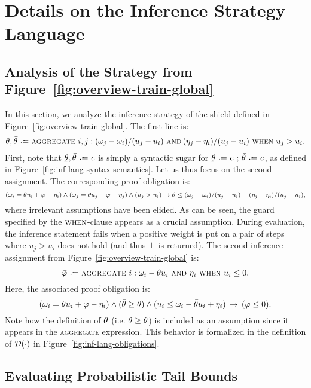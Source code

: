 \documentclass[acmsmall,screen,nonacm]{acmart}
\begin{document}
\section{Details on the Inference Strategy Language}\label{ap:inf-details}

\subsection{Analysis of the Strategy from Figure~\ref{fig:overview-train-global}}\label{ap:train-global-inf-strategy}
In this section, we analyze the inference strategy of the shield defined in Figure~\ref{fig:overview-train-global}. The first line is:
\[ \TrainThetaSlopeMin, \TrainThetaSlopeMax \slassign \slaggregate i, j: (\omega_j - \omega_i)/(u_j - u_i) \sland (\eta_j - \eta_i)/(u_j - u_i) \slwhen u_j > u_i. \]
First, note that $\TrainThetaSlopeMin, \TrainThetaSlopeMax \slassign e$ is simply a syntactic sugar for $\TrainThetaSlopeMin \slassign e \seq \TrainThetaSlopeMax \slassign e$, as defined in Figure~\ref{fig:inf-lang-syntax-semantics}. Let us thus focus on the second assignment. The corresponding proof obligation is:
\[ (\omega_i = \theta u_i + \varphi - \eta_i) \land (\omega_j = \theta u_j + \varphi - \eta_j) \land (u_j > u_i) \rightarrow \theta \le (\omega_j - \omega_i)/(u_j - u_i) + (\eta_j - \eta_i)/(u_j - u_i),  \]
where irrelevant assumptions have been elided. As can be seen, the guard specified by the $\textsc{when}$-clause appears as a crucial assumption. During evaluation, the inference statement fails when a positive weight is put on a pair of steps where $u_j > u_i$ does not hold (and thus $\bot$ is returned). The second inference assignment from Figure~\ref{fig:overview-train-global} is:
\[ \TrainThetaBiasMax \slassign \slaggregate i: \omega_i - \TrainThetaSlopeMax u_i \sland \eta_i \slwhen u_i \le 0. \]
Here, the associated proof obligation is:
\[ (\omega_i = \theta u_i + \varphi - \eta_i) \land (\bar{\theta} \ge \theta) \land (u_i \le \omega_i - \bar{\theta} u_i + \eta_i) \,\rightarrow\, (\varphi \le 0). \]
Note how the definition of $\bar{\theta}$ (i.e. $\bar{\theta} \ge \theta$) is included as an assumption since it appears in the \textsc{aggregate} expression. This behavior is formalized in the definition of $\mathcal{D}(\cdot)$ in Figure~\ref{fig:inf-lang-obligations}.


\subsection{Evaluating Probabilistic Tail Bounds}\label{sec:eval-tail-expressions}
\end{document}
